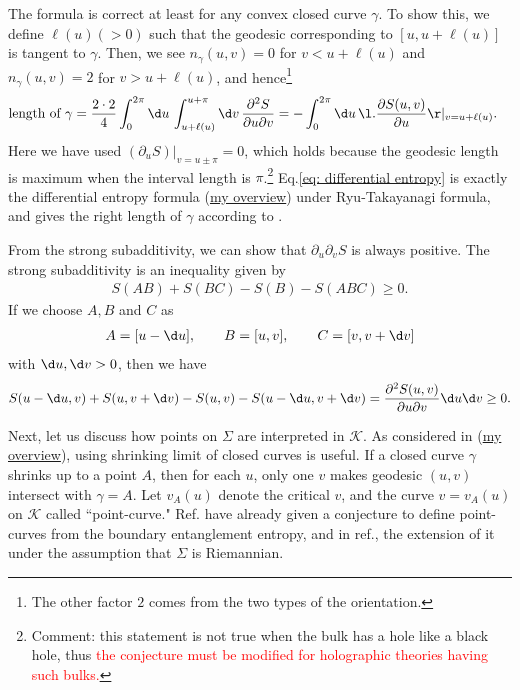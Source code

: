\documentclass[12pt]{article}
\newcommand{\overview}[1]{\href{#1}{\color{blue}my overview}}
\begin{document}
The formula is correct  at least for any convex closed curve $\gamma$.
To show this, we define $\ell(u)(>0)$ such that the geodesic corresponding to $[u,u+\ell(u)]$ is tangent to $\gamma$.
Then, we see $n_\gamma(u,v) = 0$ for $v<u + \ell(u)$ and $n_\gamma(u,v) = 2$ for $v>u+\ell(u)$, and hence\footnote{
The other factor $2$ comes from the two types of the orientation.
}
\begin{align}
	\mbox{length of $\gamma$}
	&=\frac{2\cdot 2}{4}\int_0^{2\pi}\d u\,\int_{u+\ell(u)}^{u+\pi}\d v\,\frac{\partial^2 S}{\partial u\partial v}=-\int_0^{2\pi}\d u\, \l.\frac{\partial S(u,v)}{\partial u}\r|_{v = u+\ell(u)}.
	\label{eq: differential entropy}
\end{align}
Here we have used $(\partial_u S)|_{v = u\pm\pi} = 0$, which holds because the geodesic length is maximum when the interval length is $\pi$.\footnote{
Comment: this statement is not true when the bulk has a hole like a black hole, thus \textcolor{red}{the conjecture must be modified for holographic theories having such bulks.}}
Eq.\eqref{eq: differential entropy} is exactly the differential entropy formula (\overview{https://albertmcc.github.io/web/overview_papers/Hole_ographic_spacetime.pdf}) under Ryu-Takayanagi formula, and gives the right length of $\gamma$ according to \cite{Headrick:2014eia}.

From the strong subadditivity, we can show that $\partial_u\partial_v S$ is always positive.
The strong subadditivity is an inequality given by
\begin{align}
	S(AB) + S(BC) - S(B)-S(ABC) \geq 0.
\end{align}
If we choose $A,B$ and $C$ as
\begin{align}
	A=[u-\d u],\qquad
	B=[u,v],\qquad
	C = [v,v+\d v]
\end{align}
with $\d u,\d v>0$, then we have
\begin{align}
	S(u-\d u,v) + S(u,v+\d v) - S(u,v) - S(u-\d u,v+\d v)
	=
	\frac{\partial^2 S(u,v)}{\partial u\partial v}\d u\d v\geq 0.
\end{align}

Next, let us discuss how points on $\Sigma$ are interpreted in $\mathcal K$.
As considered in \cite{Czech:2014ppa} (\overview{https://albertmcc.github.io/web/overview_papers/Nuts_and_Bolts_for_Creating_space.pdf}), using shrinking limit of closed curves is useful.
If a closed curve $\gamma$ shrinks up to a point $A$, then for each $u$, only one $v$ makes geodesic $(u,v)$ intersect with $\gamma = A$.
Let $v_A(u)$ denote the critical $v$, and the curve $v= v_A(u)$ on $\mathcal K$ called ``point-curve."
Ref.\cite{Czech:2014ppa} have already given a conjecture to define point-curves from the boundary entanglement entropy, and in ref.\cite{Czech:2015qta}, the extension of it under the assumption that $\Sigma$ is Riemannian.
\end{document}

